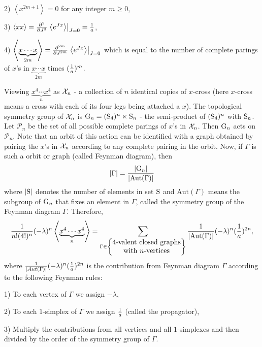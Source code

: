 \documentclass{article}
\newcommand{\ms}{\mathscr}
\newtheorem{main theorem}[defn]{Main Theorem}
\begin{document}
2) $\left\langle x^{2m+1}\right\rangle=0$  for any integer $m\ge
0$,

3) $\left\langle xx\right\rangle={\partial^2\over \partial
J^2}\left.\left\langle e^{Jx}\right\rangle\right|_{J=0}={1\over
a}$,

4) $\left\langle \underbrace{x\cdots
x}_{2m}\right\rangle={\partial^{2m}\over \partial
J^{2m}}\left.\left\langle e^{Jx}\right\rangle\right|_{J=0}$ which
is equal to the number of complete parings of $x$'s in
$\underbrace{x\cdots x}_{2m}$ times $({1\over a})^m$.

Viewing $\underbrace{x^4\cdots x^4}_{n}$ as ${\cal X}_n$ - a
collection of $n$ identical copies of $x$-cross (here $x$-cross
means a cross with each of its four legs being attached a $x$).
The topological symmetry group of ${\cal X}_n$ is
$\hbox{G}_n=(\hbox{S}_4)^n\ltimes \hbox{S}_n$ - the semi-product of $(\hbox{S}_4)^n$ with
$\hbox{S}_n$. Let $\ms{P}_n$ be the set of all possible complete parings
of $x$'s in ${\cal X}_n$. Then $\hbox{G}_n$ acts on $\ms{ P}_n$. Note
that an orbit of this action can be identified with a graph
obtained by pairing the $x$'s in ${\cal X}_n$ according to any
complete pairing in the orbit. Now, if $\Gamma$ is such a orbit or
graph (called Feynman diagram), then
\begin{eqnarray}
|\Gamma|={|\hbox{G}_n|\over |\mathrm{Aut}(\Gamma)|}
\end{eqnarray}
where $|\hbox{S}|$ denotes the number of elements in set
$\hbox{S}$ and $\mathrm{Aut}(\Gamma)$ means the subgroup of
$\hbox{G}_n$ that fixes an element in $\Gamma$, called the
symmetry group of the Feynman diagram $\Gamma$. Therefore,
$${1\over n!(4!)^n}(-\lambda)^n\left\langle  \underbrace{x^4\cdots x^4}_n\right\rangle
=\sum_{\Gamma\in\left\{
\begin{matrix}
\hbox{$4$-valent closed graphs}\cr
\hbox{with $n$-vertices}
\end{matrix}
\right\}}{1\over |\mathrm{Aut}(\Gamma)|}(-\lambda)^n({1\over
a})^{2n},$$ where ${1\over |Aut(\Gamma)|}(-\lambda)^n({1\over
a})^{2n}$ is the contribution from Feynman diagram $\Gamma$
according to the following Feynman rules:

1) To each vertex of $\Gamma$ we assign $-\lambda$,

2) To each $1$-simplex of $\Gamma$ we assign ${1\over a}$ (called
the propagator),

3) Multiply the contributions from all vertices and all
$1$-simplexes and then divided by the order of the symmetry group
of $\Gamma$.
\end{document}
